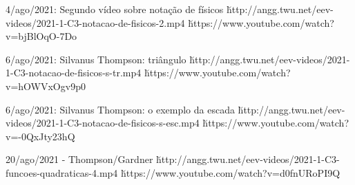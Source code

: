 \documentclass[oneside,12pt]{article}
\begin{document}
{{    \bsk

    4/ago/2021: Segundo vídeo sobre notação de físicos
    \u{http://angg.twu.net/eev-videos/2021-1-C3-notacao-de-fisicos-2.mp4}
    \u{https://www.youtube.com/watch?v=bjBlOqO-7Do}

    \bsk

    6/ago/2021: Silvanus Thompson: triângulo
    \u{http://angg.twu.net/eev-videos/2021-1-C3-notacao-de-fisicos-s-tr.mp4}
    \u{https://www.youtube.com/watch?v=hOWVxOgv9p0}

    \bsk

    6/ago/2021: Silvanus Thompson: o exemplo da escada
    \u{http://angg.twu.net/eev-videos/2021-1-C3-notacao-de-fisicos-s-esc.mp4}
    \u{https://www.youtube.com/watch?v=-0QxJty23hQ}

    \bsk

    20/ago/2021 - Thompson/Gardner
    \u{http://angg.twu.net/eev-videos/2021-1-C3-funcoes-quadraticas-4.mp4}
    \u{https://www.youtube.com/watch?v=d0fnURoPI9Q}

}}








\end{document}
